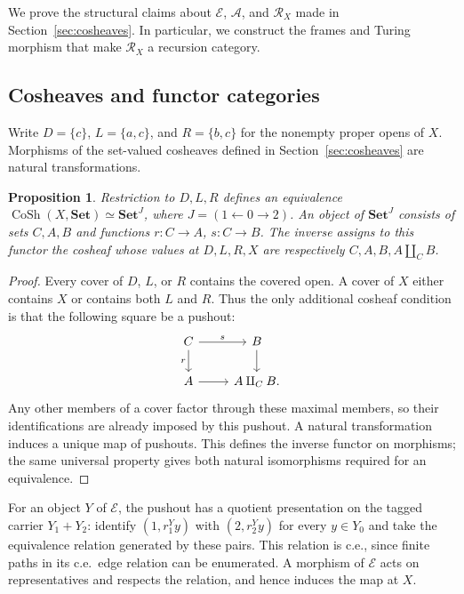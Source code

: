 \documentclass[11pt]{article}
\newtheorem{proposition}[theorem]{Proposition}
\begin{document}
We prove the structural claims about $\mathcal E$, $\mathcal A$, and
$\mathscr R_X$ made in Section~\ref{sec:cosheaves}. In particular,
we construct the frames and Turing morphism that make
$\mathscr R_X$ a recursion category.

\subsection{Cosheaves and functor categories}

Write $D=\{c\}$, $L=\{a,c\}$, and $R=\{b,c\}$ for the nonempty
proper opens of $X$. Morphisms of the set-valued cosheaves defined in
Section~\ref{sec:cosheaves} are natural transformations.

\begin{proposition}\label{prop:fork-cosheaves}
Restriction to $D,L,R$ defines an equivalence
$\operatorname{CoSh}(X,\mathbf{Set})\simeq\mathbf{Set}^{J}$,
where $J=(1\leftarrow0\to2)$. An object of $\mathbf{Set}^{J}$
consists of sets $C,A,B$ and functions $r:C\to A$, $s:C\to B$.
The inverse assigns to this functor the cosheaf whose values at
$D,L,R,X$ are respectively $C,A,B,A\amalg_C B$.
\end{proposition}
\begin{proof}
Every cover of $D$, $L$, or $R$ contains the covered open. A cover
of $X$ either contains $X$ or contains both $L$ and $R$. Thus the
only additional cosheaf condition is that the following square be
a pushout:
\[
\begin{tikzcd}
C\arrow[r,"s"]\arrow[d,"r"']&B\arrow[d]\\
A\arrow[r]&A\amalg_C B.
\end{tikzcd}
\]
Any other members of a cover factor through these maximal members,
so their identifications are already imposed by this pushout.
A natural transformation induces a unique map of pushouts.
This defines the inverse functor on morphisms; the same universal
property gives both natural isomorphisms required for an equivalence.
\end{proof}

For an object $Y$ of $\mathcal E$, the pushout has a
quotient presentation on the tagged carrier $Y_1+Y_2$: identify
$(1,r_1^Yy)$ with $(2,r_2^Yy)$ for every $y\in Y_0$ and take the
equivalence relation generated by these pairs. This relation is c.e.,
since finite paths in its c.e.\ edge relation can be enumerated.
A morphism of $\mathcal E$ acts on representatives and respects the
relation, and hence induces the map at $X$.
\end{document}
